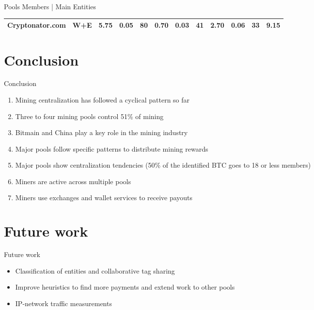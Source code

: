 \documentclass[10pt]{beamer}
\begin{document}
\begin{frame}[fragile]{Pools Members | Main Entities}
\begin{table}
{\begin{tabular}{@{}llrrrrrrrrrr@{}}
            Cryptonator.com     & W+E     & 5.75    & 0.05  & 80          & 0.70    & 0.03  & 41          & 2.70    & 0.06  & 33          & 9.15      \\ 
            \bottomrule
            \end{tabular}
        }
    \end{table} 
\end{frame}

\section{Conclusion} 
\begin{frame}[fragile]{Conclusion}
    \begin{enumerate}
        \item Mining centralization has followed a cyclical pattern so far \pause
        \item Three to four mining pools control 51\% of mining \pause
        \item Bitmain and China play a key role in the mining industry \pause
        \item Major pools follow specific patterns to distribute mining rewards \pause
        \item Major pools show centralization tendencies (50\% of the identified BTC goes to 18 or less members) \pause
        \item Miners are active across multiple pools \pause
        \item Miners use exchanges and wallet services to receive payouts
    \end{enumerate}
\end{frame}

\section{Future work} 
\begin{frame}[fragile]{Future work}
    \begin{itemize}
        \item Classification of entities and collaborative tag sharing 
        \item Improve heuristics to find more payments and extend work to other pools 
        \item IP-network traffic measurements
    \end{itemize}
\end{frame}
 
\end{document}

